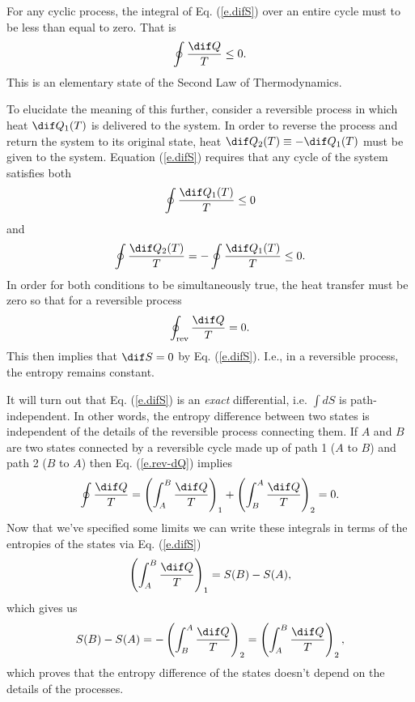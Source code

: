 For any cyclic process, the integral of Eq. (\ref{e.difS}) over an entire cycle must to be less than equal to zero. That is
\begin{equation}
	\oint \frac{\dif Q}{T} \leq 0. \label{e.sec-law-1}
\end{equation}
This is an elementary state of the Second Law of Thermodynamics.

To elucidate the meaning of this further, consider a reversible process in which heat $\dif Q_1 (T)$ is delivered to the system.
In order to reverse the process and return the system to its original state, heat $\dif Q_2 (T) \equiv -\dif Q_1 (T)$ must be given to the system. Equation (\ref{e.difS}) requires that any cycle of the system satisfies both
\[
	\oint \frac{\dif Q_1 (T)}{T} \leq 0
\]
and
\[
	\oint \frac{\dif Q_2 (T)}{T} = -\oint \frac{\dif Q_1(T)}{T} \leq 0.
\]
In order for both conditions to be simultaneously true, the heat transfer must be zero so that for a reversible process
\begin{equation}
	\oint_\mathrm{rev} \frac{\dif Q}{T} = 0. \label{e.rev-dQ}
\end{equation}
This then implies that $\dif S = 0$ by Eq. (\ref{e.difS}).
I.e., in a reversible process, the entropy remains constant.

It will turn out that Eq. (\ref{e.difS}) is an {\it exact} differential, i.e. $\int dS$ is path-independent.
In other words, the entropy difference between two states is independent of the details of the reversible process connecting them.
If $A$ and $B$ are two states connected by a reversible cycle made up of path 1 ($A$ to $B$) and path 2 ($B$ to $A$) then Eq. (\ref{e.rev-dQ}) implies
\begin{equation}
	\oint \frac{\dif Q}{T} = \left(\int_A^B\frac{\dif Q}{T}\right)_1 + \left(\int_B^A\frac{\dif Q}{T}\right)_2 = 0.
\end{equation}
Now that we've specified some limits we can write these integrals in terms of the entropies of the states via Eq. (\ref{e.difS})
\[
	\left(\int_A^B\frac{\dif Q}{T}\right)_1 = S(B) - S(A),
\]
which gives us
\begin{equation}
	S(B) - S(A) = -\left(\int_B^A\frac{\dif Q}{T}\right)_2 = \left(\int_A^B\frac{\dif Q}{T}\right)_2,
\end{equation}
which proves that the entropy difference of the states doesn't depend on the details of the processes.

